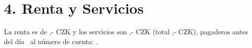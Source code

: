 \section*{4. Renta y Servicios}
La renta es de \Rentrentamount,- CZK y los servicios son \Rentservicesamount,- CZK (total \Renttotalamount,- CZK), pagaderos antes del día \Rentpaymentday\ al número de cuenta: \Rentbankaccount.
